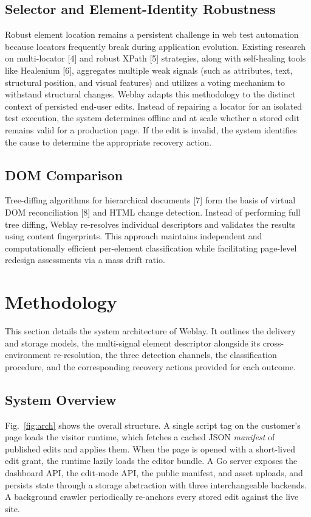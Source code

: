 \documentclass[conference]{IEEEtran}
\begin{document}
\subsection{Selector and Element-Identity Robustness}
Robust element location remains a persistent challenge in web test automation because locators frequently break during application evolution. Existing research on multi-locator [4] and robust XPath [5] strategies, along with self-healing tools like Healenium [6], aggregates multiple weak signals (such as attributes, text, structural position, and visual features) and utilizes a voting mechanism to withstand structural changes. Weblay adapts this methodology to the distinct context of persisted end-user edits. Instead of repairing a locator for an isolated test execution, the system determines offline and at scale whether a stored edit remains valid for a production page. If the edit is invalid, the system identifies the cause to determine the appropriate recovery action.

\subsection{DOM Comparison}
Tree-diffing algorithms for hierarchical documents [7] form the basis of virtual DOM reconciliation [8] and HTML change detection. Instead of performing full tree diffing, Weblay re-resolves individual descriptors and validates the results using content fingerprints. This approach maintains independent and computationally efficient per-element classification while facilitating page-level redesign assessments via a mass drift ratio.

\section{Methodology}\label{sec:method}
This section details the system architecture of Weblay. It outlines the delivery and storage models, the multi-signal element descriptor alongside its cross-environment re-resolution, the three detection channels, the classification procedure, and the corresponding recovery actions provided for each outcome.

\subsection{System Overview}
Fig.~\ref{fig:arch} shows the overall structure. A single script tag on the customer's page loads the visitor runtime, which fetches a cached JSON \emph{manifest} of published edits and applies them. When the page is opened with a short-lived edit grant, the runtime lazily loads the editor bundle. A Go server exposes the dashboard API, the edit-mode API, the public manifest, and asset uploads, and persists state through a storage abstraction with three interchangeable backends. A background crawler periodically re-anchors every stored edit against the live site.
\end{document}
